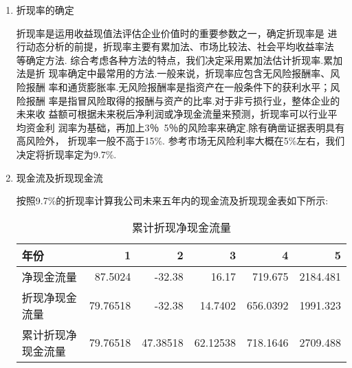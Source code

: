 \begin{enumerate}
\item 折现率的确定

      折现率是运用收益现值法评估企业价值时的重要参数之一，确定折现率是 进行动态分析的前提，折现率主要有累加法、市场比较法、社会平均收益率法 等确定方法. 综合考虑各种方法的特点，我们决定采用累加法估计折现率.累加法是折 现率确定中最常用的方法.一般来说，折现率应包含无风险报酬率、风险报酬 率和通货膨胀率.无风险报酬率是指资产在一般条件下的获利水平；风险报酬 率是指冒风险取得的报酬与资产的比率.对于非亏损行业，整体企业的未来收 益额可根据未来税后净利润或净现金流量来预测，折现率可以行业平均资金利 润率为基础，再加上3％~5％的风险率来确定.除有确凿证据表明具有高风险外， 折现率一般不高于15\%. 参考市场无风险利率大概在5\%左右，我们决定将折现率定为9.7\%.

\item 现金流及折现现金流

      按照9.7\%的折现率计算我公司未来五年内的现金流及折现现金表如下所示:

      \begin{table}[htbp]
       \centering
       \caption{累计折现净现金流量}
       \begin{tabular}{|lrrrrr|}
       \toprule
        年份   & 1     & 2     & 3     & 4     & 5 \\
        \hline
        净现金流量 & 87.5024 & -32.38 & 16.17 & 719.675 & 2184.481 \\
       折现净现金流量 & 79.76518 & -32.38 & 14.7402 & 656.0392 & 1991.323 \\
       累计折现净现金流量 & 79.76518 & 47.38518 & 62.12538 & 718.1646 & 2709.488 \\
       \bottomrule
      \end{tabular}%
       \label{tab:addlabel}%
       \end{table}%

\end{enumerate}

